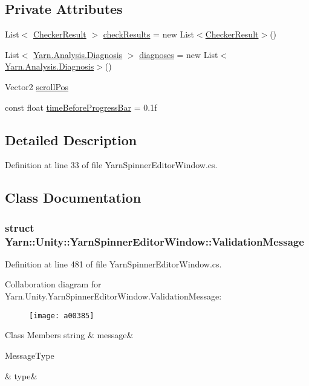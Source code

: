 \subsection*{Private Attributes}
\begin{DoxyCompactItemize}
\item 
List$<$ \hyperlink{a00049}{Checker\-Result} $>$ \hyperlink{a00186_aa85ab7bd194e5425b991b9c216d4d10e}{check\-Results} = new List$<$\hyperlink{a00049}{Checker\-Result}$>$()
\item 
List$<$ \hyperlink{a00091}{Yarn.\-Analysis.\-Diagnosis} $>$ \hyperlink{a00186_a25c92cbfdd09661a96714d05b14af886}{diagnoses} = new List$<$\hyperlink{a00091}{Yarn.\-Analysis.\-Diagnosis}$>$()
\item 
Vector2 \hyperlink{a00186_a2d9b9702b0980af9d4202aebd440124b}{scroll\-Pos}
\item 
const float \hyperlink{a00186_a62a14b3fbaf2da41154ebad0eb7b6d3f}{time\-Before\-Progress\-Bar} = 0.\-1f
\end{DoxyCompactItemize}


\subsection{Detailed Description}


Definition at line 33 of file Yarn\-Spinner\-Editor\-Window.\-cs.



\subsection{Class Documentation}
\label{a00383}
\hypertarget{a00186_a00383}{}
\subsubsection{struct Yarn\-:\-:Unity\-:\-:Yarn\-Spinner\-Editor\-Window\-:\-:Validation\-Message}


Definition at line 481 of file Yarn\-Spinner\-Editor\-Window.\-cs.



Collaboration diagram for Yarn.\-Unity.\-Yarn\-Spinner\-Editor\-Window.\-Validation\-Message\-:
\nopagebreak
\begin{figure}[H]
\begin{center}
\leavevmode
\texttt{[image: a00385]}
\end{center}
\end{figure}
\begin{DoxyFields}{Class Members}
\hypertarget{a00186_a636dce6708e779c201fa5e7d01cf2955}{string}\label{a00186_a636dce6708e779c201fa5e7d01cf2955}
&
message&
\\
\hline

\hypertarget{a00186_a7d342190c7657fbbe85eb6fa66bcabb8}{Message\-Type}\label{a00186_a7d342190c7657fbbe85eb6fa66bcabb8}
&
type&
\\
\hline

\end{DoxyFields}


